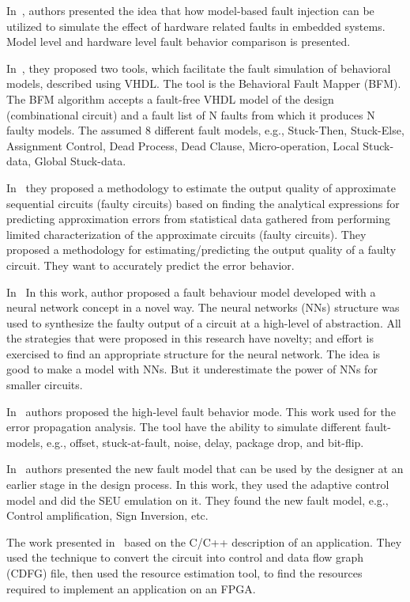 In~\cite{svenningsson2010model}, authors presented the idea that how model-based fault injection can be utilized to
simulate the effect of hardware related faults in embedded systems. Model level and hardware level
fault behavior comparison is presented.

In~\cite{hayne1999behavioral},  they proposed two tools, which facilitate the fault simulation of behavioral
models, described using VHDL. The tool is the Behavioral Fault Mapper (BFM). The BFM algorithm
accepts a fault-free VHDL model of the design (combinational circuit) and a fault list of N faults from
which it produces N faulty models. The assumed 8 different fault models, e.g., Stuck-Then, Stuck-Else,
Assignment Control, Dead Process, Dead Clause, Micro-operation, Local Stuck-data, Global Stuck-data. 

In~\cite{kapare2016automated}  they proposed a methodology to estimate the output quality of approximate
sequential circuits (faulty circuits) based on finding the analytical expressions for predicting
approximation errors from statistical data gathered from performing limited characterization of the
approximate circuits (faulty circuits). They proposed a methodology for estimating/predicting the output
quality of a faulty circuit. They want to accurately predict the error behavior. 

In~\cite{mirzadeh2014modeling} In this work, author proposed a fault behaviour model developed with a neural network
concept in a novel way. The neural networks (NNs) structure was used to synthesize the faulty output of a
circuit at a high-level of abstraction. All the strategies that were proposed in this research have novelty;
and effort is exercised to find an appropriate structure for the neural network. The idea is good to make a model with NNs. But it underestimate the power of NNs for
smaller circuits.


In~\cite{janschek2017errorsim} authors proposed the high-level fault behavior mode. This work  used for the error propagation analysis. The tool have the ability to simulate different fault-models, e.g., offset, stuck-at-fault, noise, delay, package drop, and bit-flip. 

In~\cite{hobeika2013flight} authors presented the new fault model that can be used by the designer at an earlier stage in the design process. In this work, they used the adaptive control model and did the SEU emulation on it. They found the new fault model, e.g., Control amplification, Sign Inversion, etc.

The work presented in~\cite{thibeault2013library} based on the C/C++ description of an application. They used the technique to convert the circuit into control and data flow graph (CDFG) file, then used the resource estimation tool, to find the resources required to implement an application on an FPGA.

